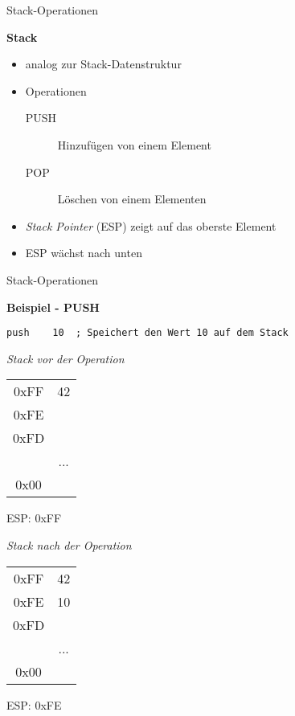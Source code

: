 \begin{frame}{Stack-Operationen}

\begin{center}
\textbf{Stack}
\end{center}

\begin{itemize}
	\item analog zur Stack-Datenstruktur

	\item Operationen
	\begin{description}
		\item [PUSH] Hinzufügen von einem Element
		
		\item [POP] Löschen von einem Elementen
	\end{description}

	\item \textit{Stack Pointer} (ESP) zeigt auf das oberste Element

	\item ESP wächst nach unten
\end{itemize}
\end{frame}


\begin{frame}[fragile]{Stack-Operationen}

\begin{center}
\textbf{Beispiel - PUSH}
\end{center}

\begin{lstlisting}
push    10  ; Speichert den Wert 10 auf dem Stack
\end{lstlisting}

\begin{multicols}{2}
\begin{minipage}{5cm}
\emph{Stack vor der Operation}\\
\begin{tabular}{c|c|}
	\cline{2-2}
   0xFF & 42\\ \cline{2-2}
   0xFE & \\ \cline{2-2}
   0xFD & \\ \cline{2-2}
	      & ... \\ \cline{2-2}
	 0x00 & \\ \cline{2-2}
\end{tabular}
ESP: 0xFF
\end{minipage}

\begin{minipage}{5cm}
\emph{Stack nach der Operation}\\
\begin{tabular}{c|c|}
	\cline{2-2}
   0xFF & 42\\ \cline{2-2}
   0xFE & 10\\ \cline{2-2}
   0xFD & \\ \cline{2-2}
	      & ... \\ \cline{2-2}
	 0x00 & \\ \cline{2-2}
\end{tabular}
ESP: 0xFE
\end{minipage}
\end{multicols}
\end{frame}


